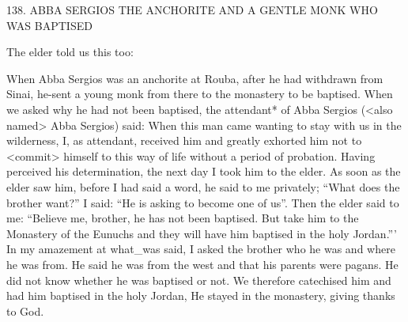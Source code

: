 138.
ABBA SERGIOS THE ANCHORITE AND
A GENTLE MONK WHO WAS BAPTISED

The elder told us this too:

When Abba Sergios was an anchorite at Rouba, after he had
withdrawn from Sinai, he-sent a young monk from there to the
monastery to be baptised.
When we asked why he had not been
baptised, the attendant* of Abba Sergios (<also named> Abba
Sergios) said: When this man came wanting to stay with us in the
wilderness, I, as attendant, received him and greatly exhorted him
not to <commit> himself to this way of life without a period of
probation.
Having perceived his determination, the next day I took
him to the elder.
As soon as the elder saw him, before I had said a
word, he said to me privately; “What does the brother want?” I
said: “He is asking to become one of us”.
Then the elder said to me:
“Believe me, brother, he has not been baptised.
But take him to the
Monastery of the Eunuchs and they will have him baptised in the
holy Jordan.”' In my amazement at what\_was said, I asked the
brother who he was and where he was from.
He said he was from
the west and that his parents were pagans.
He did not know
whether he was baptised or not.
We therefore catechised him and
had him baptised in the holy Jordan, He stayed in the monastery,
giving thanks to God.

